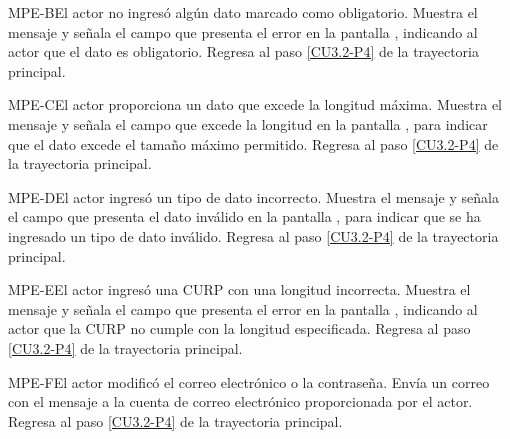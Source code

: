 
	\begin{UCtrayectoriaA}{MPE-B}{El actor no ingresó algún dato marcado como obligatorio.}
		\UCpaso[\UCsist] Muestra el mensaje  y señala el campo que presenta el error en la pantalla , indicando al actor que el dato es obligatorio.
		\UCpaso Regresa al paso \ref{CU3.2-P4} de la trayectoria principal.
	\end{UCtrayectoriaA}

	\begin{UCtrayectoriaA}{MPE-C}{El actor proporciona un dato que excede la longitud máxima.}
		\UCpaso[\UCsist] Muestra el mensaje  y señala el campo que excede la longitud en la pantalla , para indicar que el dato excede el tamaño máximo permitido.
		\UCpaso Regresa al paso \ref{CU3.2-P4} de la trayectoria principal.
	\end{UCtrayectoriaA}
	
	\begin{UCtrayectoriaA}{MPE-D}{El actor ingresó un tipo de dato incorrecto.}
		\UCpaso[\UCsist] Muestra el mensaje  y señala el campo que presenta el dato inválido en la pantalla , para indicar que se ha ingresado un tipo de dato inválido.
		\UCpaso Regresa al paso \ref{CU3.2-P4} de la trayectoria principal.


	\begin{UCtrayectoriaA}{MPE-E}{El actor ingresó una CURP con una longitud incorrecta.}
		\UCpaso[\UCsist] Muestra el mensaje  y señala el campo que presenta el error en la pantalla , indicando al actor que la CURP no cumple con la longitud especificada.
		\UCpaso Regresa al paso \ref{CU3.2-P4} de la trayectoria principal.
	\end{UCtrayectoriaA}

	\end{UCtrayectoriaA}


	\begin{UCtrayectoriaA}{MPE-F}{El actor modificó el correo electrónico o la contraseña.}
		\UCpaso[\UCsist] Envía un correo con el mensaje  a la cuenta de correo electrónico proporcionada por el actor.
		\UCpaso Regresa al paso \ref{CU3.2-P4} de la trayectoria principal.
	\end{UCtrayectoriaA}